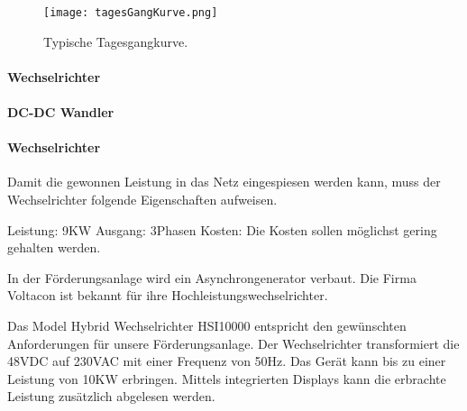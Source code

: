 \begin{figure}[H]
\centering
\texttt{[image: tagesGangKurve.png]}
\caption{Typische Tagesgangkurve. \cite{peakWaterDemand}}
\label{fig:tagesGangKurve}
\end{figure}


\paragraph{Wechselrichter}


\paragraph{DC-DC Wandler}


\paragraph{Wechselrichter}



Damit die gewonnen Leistung in das Netz eingespiesen werden kann, muss der Wechselrichter folgende Eigenschaften aufweisen. 

Leistung: 	9KW \newline
Ausgang:	3Phasen \newline
Kosten:		Die Kosten sollen möglichst gering gehalten werden. \newline

In der Förderungsanlage wird ein Asynchrongenerator verbaut. Die Firma Voltacon ist bekannt für ihre Hochleistungswechselrichter.

Das Model Hybrid Wechselrichter HSI10000 entspricht den gewünschten Anforderungen für unsere Förderungsanlage. Der Wechselrichter transformiert die 48VDC auf 230VAC mit einer Frequenz von 50\si{\hertz}. Das Gerät kann bis zu einer Leistung von 10KW erbringen. Mittels integrierten Displays kann die erbrachte Leistung zusätzlich abgelesen werden. 

